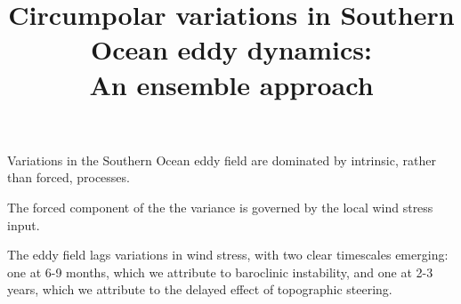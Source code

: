 \documentclass{agujournal2019}
\begin{document}
\justify
\title{Circumpolar variations in Southern Ocean eddy dynamics:\\An ensemble approach}




\begin{keypoints}
\item Variations in the Southern Ocean eddy field are dominated by intrinsic, rather than forced, processes.
\item The forced component of the the variance is governed by the local wind stress input.
\item The eddy field lags variations in wind stress, with two clear timescales emerging: one at 6-9 months, which we attribute to baroclinic instability, and one at 2-3 years, which we attribute to the delayed effect of topographic steering.
\end{keypoints}
\end{document}
